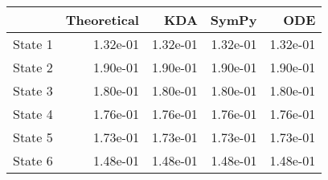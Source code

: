 \begin{tabular}{lrrrr}
\toprule
{} &  Theoretical &      KDA &    SymPy &      ODE \\
\midrule
State 1 &     1.32e-01 & 1.32e-01 & 1.32e-01 & 1.32e-01 \\
State 2 &     1.90e-01 & 1.90e-01 & 1.90e-01 & 1.90e-01 \\
State 3 &     1.80e-01 & 1.80e-01 & 1.80e-01 & 1.80e-01 \\
State 4 &     1.76e-01 & 1.76e-01 & 1.76e-01 & 1.76e-01 \\
State 5 &     1.73e-01 & 1.73e-01 & 1.73e-01 & 1.73e-01 \\
State 6 &     1.48e-01 & 1.48e-01 & 1.48e-01 & 1.48e-01 \\
\bottomrule
\end{tabular}
